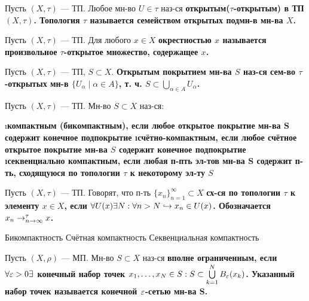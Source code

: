 \begin{defn}
Пусть $(X, \tau)$ --- ТП. Любое мн-во $U \in \tau$ наз-ся \bf{открытым}($\tau$-открытым) в ТП $(X, \tau)$. Топология $\tau$ называется \bf{семейством открытых подмн-в} мн-ва $X$.
\end{defn}

\begin{defn}
Пусть $(X, \tau)$ --- ТП. Для любого $x \in X$ \bf{окрестностью} $x$ называется произвольное $\tau$-открытое множество, содержащее $x$.
\end{defn}

\begin{defn}
Пусть $(X, \tau)$ --- ТП, $S \subset X$. \bf{Открытым покрытием} мн-ва $S$ наз-ся сем-во $\tau$-открытых мн-в $\{U_\alpha \mid \alpha \in A\}$, т. ч. $S \subset \bigcup\limits_{\alpha \in A} U_\alpha$.
\end{defn}

\begin{defn}
Пусть $(X, \tau)$ --- ТП. Мн-во $S \subset X$ наз-ся:
\begin{enumerate}
\i \bf{компактным (бикомпактным)}, если любое открытое покрытие мн-ва S содержит конечное подпокрытие
\i \bf{счётно-компактным}, если любое счётное открытое покрытие мн-ва $S$ содержит конечное подпокрытие
\i \bf{секвенциально компактным}, если любая п-пть эл-тов мн-ва S содержит п-ть, сходящуюся по топологии $\tau$ к некоторому эл-ту $S$
\end{enumerate}
\end{defn}

\begin{defn}
Пусть $(X, \tau)$ --- ТП. Говорят, что п-ть $\{x_n\}_{n=1}^\infty \subset X$ \bf{сх-ся по топологии $\tau$} к элементу $x \in X$, если $\forall U(x) \exists N: \forall n > N \hookrightarrow x_n \in U(x)$. Обозначается $x_n \rightarrow_{n \rightarrow \infty}^\tau x$.
\end{defn}

\begin{thm}
Бикомпактность 
Счётная компактность
Секвенциальная компактность
\end{thm}

\begin{defn}
Пусть $(X, \rho)$ --- МП. Мн-во $S \subset X$ наз-ся \bf{вполне ограниченным}, если $\forall \varepsilon > 0 \exists$ конечный набор точек $x_1, \dots, x_N \in S: S \subset \bigcup\limits_{k=1}^N B_\varepsilon(x_k)$. Указанный набор точек называется \bf{конечной $\varepsilon$-сетью} мн-ва S.
\end{defn}

